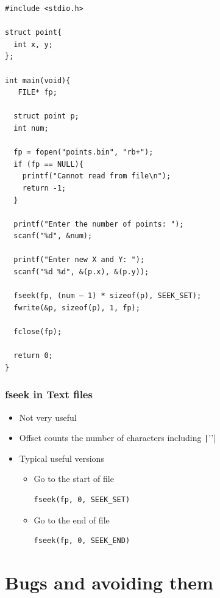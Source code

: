 \documentclass{../c-lecture}
\begin{document}
\begin{frame}[fragile]
  \begin{verbatim}
#include <stdio.h>

struct point{
  int x, y;
};

int main(void){
   FILE* fp;

  struct point p;
  int num;

  fp = fopen("points.bin", "rb+");
  if (fp == NULL){
    printf("Cannot read from file\n");
    return -1;
  }

  printf("Enter the number of points: ");
  scanf("%d", &num);

  printf("Enter new X and Y: ");
  scanf("%d %d", &(p.x), &(p.y));

  fseek(fp, (num – 1) * sizeof(p), SEEK_SET);
  fwrite(&p, sizeof(p), 1, fp);

  fclose(fp);

  return 0;
}
  \end{verbatim}
\end{frame}
\begin{frame}
  \frametitle{fseek in Text files}
  \begin{itemize}
    \item Not very useful
    \item Offset counts the number of characters including \texttt|'\n'|
    \item Typical useful versions
    \begin{itemize}
      \item Go to the start of file
      \begin{verbatim}
fseek(fp, 0, SEEK_SET)
      \end{verbatim}
      \item Go to the end of file
      \begin{verbatim}
fseek(fp, 0, SEEK_END)
      \end{verbatim}
    \end{itemize}
  \end{itemize}
\end{frame}

\section{Bugs and avoiding them}
\end{document}
